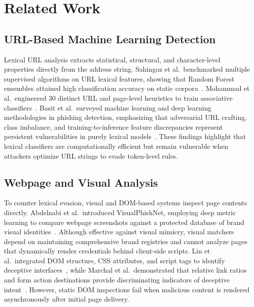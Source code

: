 \documentclass[conference]{IEEEtran}
\begin{document}
\section{Related Work}

\subsection{URL-Based Machine Learning Detection}
Lexical URL analysis extracts statistical, structural, and character-level properties directly from
the address string.
Sahingoz et al.\ benchmarked multiple supervised algorithms on URL lexical features, showing that
Random Forest ensembles attained high classification accuracy on static corpora~\cite{ref4}.
Mohammad et al.\ engineered 30 distinct URL and page-level heuristics to train associative
classifiers~\cite{ref5}.
Basit et al.\ surveyed machine learning and deep learning methodologies in phishing detection,
emphasizing that adversarial URL crafting, class imbalance, and training-to-inference feature
discrepancies represent persistent vulnerabilities in purely lexical models~\cite{ref6}.
These findings highlight that lexical classifiers are computationally efficient but remain vulnerable
when attackers optimize URL strings to evade token-level rules.

\subsection{Webpage and Visual Analysis}
To counter lexical evasion, visual and DOM-based systems inspect page contents directly.
Abdelnabi et al.\ introduced VisualPhishNet, employing deep metric learning to compare webpage
screenshots against a protected database of brand visual identities~\cite{ref7}.
Although effective against visual mimicry, visual matchers depend on maintaining comprehensive brand
registries and cannot analyze pages that dynamically render credentials behind client-side scripts.
Lin et al.\ integrated DOM structure, CSS attributes, and script tags to identify deceptive
interfaces~\cite{ref8}, while Marchal et al.\ demonstrated that relative link ratios and form action
destinations provide discriminating indicators of deceptive intent~\cite{ref9}.
However, static DOM inspections fail when malicious content is rendered asynchronously after initial
page delivery.
\end{document}
